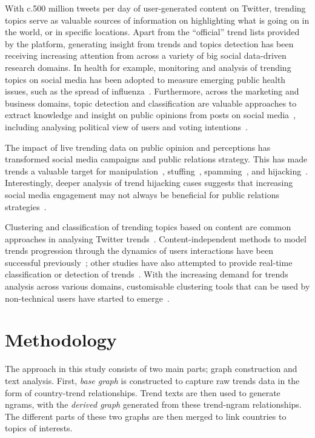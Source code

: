 \documentclass{comjnl}
\begin{document}
With c.500 million tweets per day of user-generated content on Twitter, trending topics serve as valuable sources of information on highlighting what is going on in the world, or in specific locations. Apart from the ``official'' trend lists provided by the platform, generating insight from trends and topics detection has been receiving increasing attention from across a variety of big social data-driven research domains. In health for example, monitoring and analysis of trending topics on social media has been adopted to measure emerging public health issues, such as the spread of influenza~\cite{Achrekar2011,Parker2015}. Furthermore, across the marketing and business domains, topic detection and classification are valuable approaches to extract knowledge and insight on public opinions from posts on social media~\cite{blamey-et-al-2012,blamey-et-al-2013,Bello2013,mostafa-et-al-ai2016,albishry-et-al:ssei2018}, including analysing political view of users and voting intentions~\cite{oatley+crick:2014,Fang2015}.

The impact of live trending data on public opinion and perceptions has transformed social media campaigns and public relations strategy. This has made trends a valuable target for manipulation~\cite{Zhang2017}, stuffing~\cite{Irani2010}, spamming~\cite{Sedhai2015,Chu2012}, and hijacking~\cite{VanDam2016}. Interestingly, deeper analysis of trend hijacking cases suggests that increasing social media engagement may not always be beneficial for public relations strategies~\cite{Sanderson2016,albishry-et-al:ssei2018}.

Clustering and classification of trending topics based on content are common approaches in analysing Twitter trends~\cite{Zubiaga2011,Benhardus2013,Ferragina2015,albishry-et-al:iccci2017}. Content-independent methods to model trends progression through the dynamics of users interactions have been successful previously~\cite{TenThij2016}; other studies have also attempted to provide real-time classification or detection of trends~\cite{Mathioudakis2010,Zubiaga2015}. With the increasing demand for trends analysis across various domains, customisable clustering tools that can be used by non-technical users have started to emerge~\cite{Arn2018}.

\section{Methodology}\label{method}

The approach in this study consists of two main parts; graph construction and text analysis. First, {\emph{base graph}} is constructed to capture raw trends data in the form of country-trend relationships. Trend texts are then used to generate ngrams, with the {\emph{derived graph}} generated from these trend-ngram relationships. The different parts of these two graphs are then merged to link countries to topics of interests.
\end{document}
